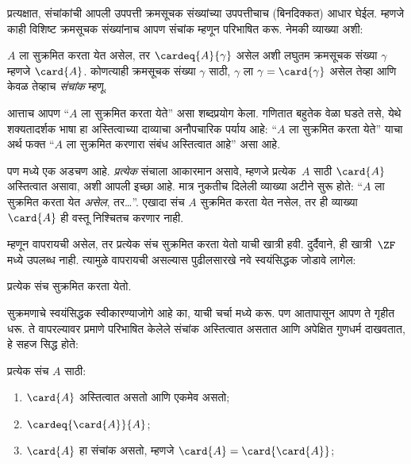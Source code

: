 \documentclass[../../../include/open-logic-section]{subfiles}
\begin{document}

प्रत्यक्षात, संचांकांची आपली उपपत्ती क्रमसूचक संख्यांच्या उपपत्तीचाच (बिनदिक्कत) आधार घेईल. म्हणजे काही विशिष्ट क्रमसूचक संख्यांनाच आपण संचांक म्हणून परिभाषित करू. नेमकी व्याख्या अशी:

\begin{defn}
$A$ ला सुक्रमित करता येत असेल, तर $\cardeq{A}{\gamma}$ असेल अशी लघुतम क्रमसूचक संख्या $\gamma$ म्हणजे $\card{A}$. कोणत्याही क्रमसूचक संख्या $\gamma$ साठी, $\gamma$ ला $\gamma = \card{\gamma}$ असेल तेव्हा आणि केवळ तेव्हाच \emph{संचांक} म्हणू.
\end{defn}

आत्ताच आपण “$A$ ला सुक्रमित करता येते” असा शब्दप्रयोग केला. गणितात बहुतेक वेळा घडते तसे, येथे शक्यतादर्शक भाषा हा अस्तित्वाच्या दाव्याचा अनौपचारिक पर्याय आहे: “$A$ ला सुक्रमित करता येते” याचा अर्थ फक्त “$A$ ला सुक्रमित करणारा संबंध अस्तित्वात आहे” असा आहे.

पण  मध्ये एक अडचण आहे. \emph{प्रत्येक} संचाला आकारमान असावे, म्हणजे प्रत्येक~$A$ साठी $\card{A}$ अस्तित्वात असावा, अशी आपली इच्छा आहे. मात्र नुकतीच दिलेली व्याख्या अटीने सुरू होते: “$A$ ला सुक्रमित करता येत \emph{असेल}, तर\ldots”. एखादा संच $A$ सुक्रमित करता येत नसेल, तर ही व्याख्या $\card{A}$ ही वस्तू निश्चितच करणार नाही.

म्हणून  वापरायची असेल, तर प्रत्येक संच सुक्रमित करता येतो याची खात्री हवी. दुर्दैवाने, ही खात्री~$\ZF$ मध्ये उपलब्ध नाही. त्यामुळे  वापरायची असल्यास पुढीलसारखे नवे स्वयंसिद्धक जोडावे लागेल:
\begin{axiom}[सुक्रमण]
प्रत्येक संच सुक्रमित करता येतो.
\end{axiom}
सुक्रमणाचे स्वयंसिद्धक स्वीकारण्याजोगे आहे का, याची चर्चा  मध्ये करू. पण आतापासून आपण ते गृहीत धरू. ते वापरल्यावर  प्रमाणे परिभाषित केलेले संचांक अस्तित्वात असतात आणि अपेक्षित गुणधर्म दाखवतात, हे सहज सिद्ध होते:

\begin{lem}
प्रत्येक संच $A$ साठी:
\begin{enumerate}
  \item{} $\card{A}$ अस्तित्वात असतो आणि एकमेव असतो;
  \item{} $\cardeq{\card{A}}{A}$;
  \item{} $\card{A}$ हा संचांक असतो, म्हणजे
  $\card{A} = \card{\card{A}}$;
\end{enumerate}
\end{lem}
\end{document}
